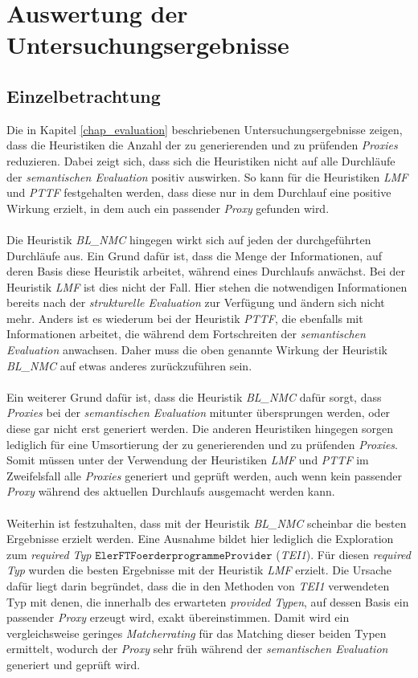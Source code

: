 \section{Auswertung der Untersuchungsergebnisse}
\subsection{Einzelbetrachtung}\label{disc_einzel}
Die in Kapitel \ref{chap_evaluation} beschriebenen Untersuchungsergebnisse zeigen, dass die \Gls{Heuristik}en die Anzahl der zu generierenden und zu prüfenden \emph{Proxies} reduzieren. Dabei zeigt sich, dass sich die \Gls{Heuristik}en nicht auf alle Durchläufe der \emph{semantischen Evaluation} positiv auswirken. So kann für die \Gls{Heuristik}en \emph{LMF} und \emph{PTTF} festgehalten werden, dass diese nur in dem Durchlauf eine positive Wirkung erzielt, in dem auch ein passender \emph{Proxy} gefunden wird.
\\\\
Die \Gls{Heuristik} \emph{BL\_NMC} hingegen wirkt sich auf jeden der durchgeführten Durchläufe aus. Ein Grund dafür ist, dass die Menge der Informationen, auf deren Basis diese \Gls{Heuristik} arbeitet, während eines Durchlaufs anwächst. Bei der \Gls{Heuristik} \emph{LMF} ist dies nicht der Fall. Hier stehen die notwendigen Informationen bereits nach der \emph{strukturelle Evaluation} zur Verfügung und ändern sich nicht mehr. Anders ist es wiederum bei der Heuristik \emph{PTTF}, die ebenfalls mit Informationen arbeitet, die während dem Fortschreiten der \emph{semantischen Evaluation} anwachsen. Daher muss die oben genannte Wirkung der \Gls{Heuristik} \emph{BL\_NMC} auf etwas anderes zurückzuführen sein. 
\\\\
Ein weiterer Grund dafür ist, dass die Heuristik \emph{BL\_NMC} dafür sorgt, dass \emph{Proxies} bei der \emph{semantischen Evaluation} mitunter übersprungen werden, oder diese gar nicht erst generiert werden. Die anderen \Gls{Heuristik}en hingegen sorgen lediglich für eine Umsortierung der zu generierenden und zu prüfenden \emph{Proxies}. Somit müssen unter der Verwendung der \Gls{Heuristik}en  \emph{LMF} und \emph{PTTF} im Zweifelsfall alle \emph{Proxies} generiert und geprüft werden, auch wenn kein passender \emph{Proxy} während des aktuellen Durchlaufs ausgemacht werden kann.
\\\\
Weiterhin ist festzuhalten, dass mit der \Gls{Heuristik} \emph{BL\_NMC} scheinbar die besten Ergebnisse erzielt werden. Eine Ausnahme bildet hier lediglich die Exploration zum \emph{required Typ} \linebreak$\texttt{ElerFTFoerderprogrammeProvider}$ (\emph{TEI1}). Für diesen \emph{required Typ} wurden die besten Ergebnisse mit der \Gls{Heuristik} \emph{LMF} erzielt. Die Ursache dafür liegt darin begründet, dass die in den Methoden von \emph{TEI1} verwendeten Typ mit denen, die innerhalb des erwarteten \emph{provided Typen}, auf dessen Basis ein passender \emph{Proxy} erzeugt wird, exakt übereinstimmen. Damit wird ein vergleichsweise geringes \emph{Matcherrating} für das Matching dieser beiden Typen ermittelt, wodurch der \emph{Proxy} sehr früh während der \emph{semantischen Evaluation} generiert und geprüft wird.
